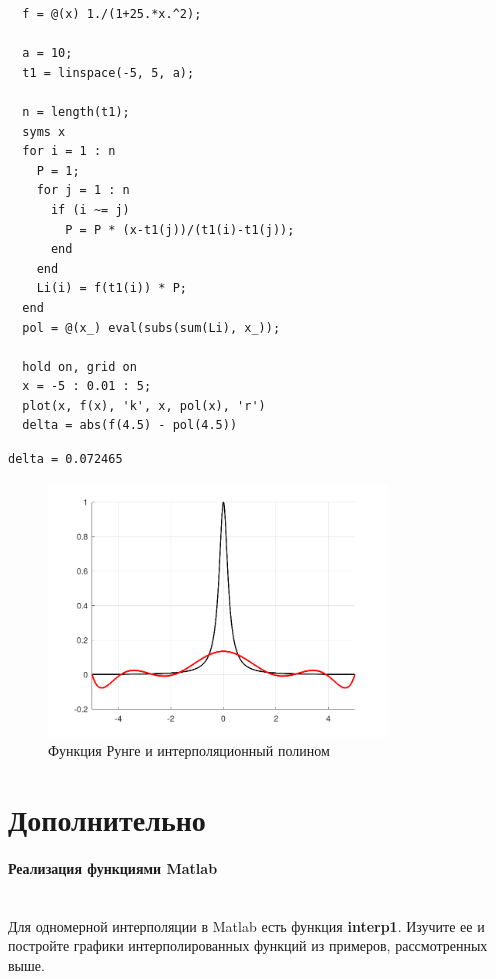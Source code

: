 \begin{lstlisting}
  f = @(x) 1./(1+25.*x.^2);

  a = 10;
  t1 = linspace(-5, 5, a);

  n = length(t1);
  syms x
  for i = 1 : n
    P = 1;
    for j = 1 : n
      if (i ~= j)
        P = P * (x-t1(j))/(t1(i)-t1(j));
      end
    end
    Li(i) = f(t1(i)) * P;
  end
  pol = @(x_) eval(subs(sum(Li), x_));

  hold on, grid on
  x = -5 : 0.01 : 5;
  plot(x, f(x), 'k', x, pol(x), 'r')
  delta = abs(f(4.5) - pol(4.5))
\end{lstlisting}
\begin{lstlisting}[backgroundcolor=\color{cyan}]
  delta = 0.072465
\end{lstlisting}

\begin{figure}[H]
  \caption{Функция Рунге и интерполяционный полином}
  \label{fig:plot_6}
  \centering
  \includegraphics[width=0.8\textwidth]{images/task_6_1.png}
\end{figure}


\section{Дополнительно}
\paragraph{Реализация функциями Matlab} ~\\
Для одномерной интерполяции в Matlab есть функция \textbf{interp1}. Изучите ее и постройте графики интерполированных функций из примеров, рассмотренных выше.

